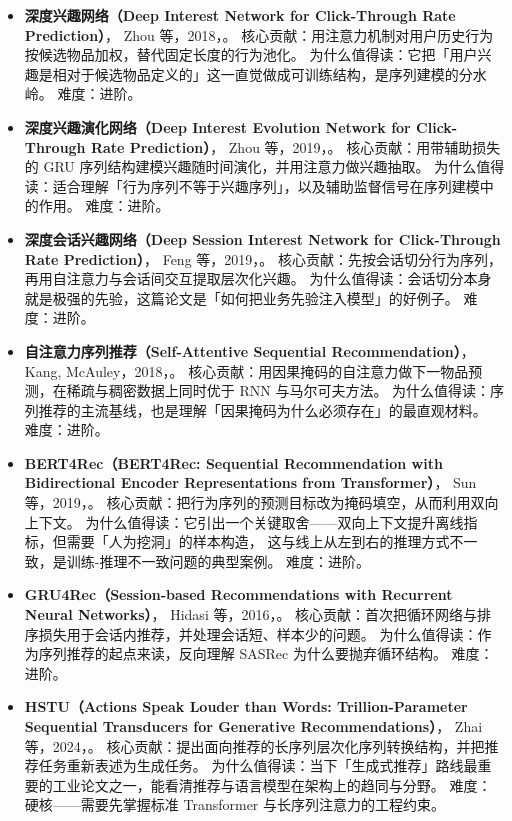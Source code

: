 \begin{itemize}
  \item \textbf{深度兴趣网络（Deep Interest Network for Click-Through Rate Prediction）}，
        Zhou 等，2018，\cite{zhou2018din}。
        核心贡献：用注意力机制对用户历史行为按候选物品加权，替代固定长度的行为池化。
        为什么值得读：它把「用户兴趣是相对于候选物品定义的」这一直觉做成可训练结构，是序列建模的分水岭。
        难度：进阶。
  \item \textbf{深度兴趣演化网络（Deep Interest Evolution Network for Click-Through Rate Prediction）}，
        Zhou 等，2019，\cite{zhou2019dien}。
        核心贡献：用带辅助损失的 GRU 序列结构建模兴趣随时间演化，并用注意力做兴趣抽取。
        为什么值得读：适合理解「行为序列不等于兴趣序列」，以及辅助监督信号在序列建模中的作用。
        难度：进阶。
  \item \textbf{深度会话兴趣网络（Deep Session Interest Network for Click-Through Rate Prediction）}，
        Feng 等，2019，\cite{pi2020dsin}。
        核心贡献：先按会话切分行为序列，再用自注意力与会话间交互提取层次化兴趣。
        为什么值得读：会话切分本身就是极强的先验，这篇论文是「如何把业务先验注入模型」的好例子。
        难度：进阶。
  \item \textbf{自注意力序列推荐（Self-Attentive Sequential Recommendation）}，
        Kang, McAuley，2018，\cite{kang2018sasrec}。
        核心贡献：用因果掩码的自注意力做下一物品预测，在稀疏与稠密数据上同时优于 RNN 与马尔可夫方法。
        为什么值得读：序列推荐的主流基线，也是理解「因果掩码为什么必须存在」的最直观材料。
        难度：进阶。
  \item \textbf{BERT4Rec（BERT4Rec: Sequential Recommendation with Bidirectional Encoder Representations from Transformer）}，
        Sun 等，2019，\cite{sun2019bert4rec}。
        核心贡献：把行为序列的预测目标改为掩码填空，从而利用双向上下文。
        为什么值得读：它引出一个关键取舍——双向上下文提升离线指标，但需要「人为挖洞」的样本构造，
        这与线上从左到右的推理方式不一致，是训练-推理不一致问题的典型案例。
        难度：进阶。
  \item \textbf{GRU4Rec（Session-based Recommendations with Recurrent Neural Networks）}，
        Hidasi 等，2016，\cite{hidasi2016gru4rec}。
        核心贡献：首次把循环网络与排序损失用于会话内推荐，并处理会话短、样本少的问题。
        为什么值得读：作为序列推荐的起点来读，反向理解 SASRec 为什么要抛弃循环结构。
        难度：进阶。
  \item \textbf{HSTU（Actions Speak Louder than Words: Trillion-Parameter Sequential Transducers for Generative Recommendations）}，
        Zhai 等，2024，\cite{zhai2024hstu}。
        核心贡献：提出面向推荐的长序列层次化序列转换结构，并把推荐任务重新表述为生成任务。
        为什么值得读：当下「生成式推荐」路线最重要的工业论文之一，能看清推荐与语言模型在架构上的趋同与分野。
        难度：硬核——需要先掌握标准 Transformer 与长序列注意力的工程约束。
\end{itemize}

